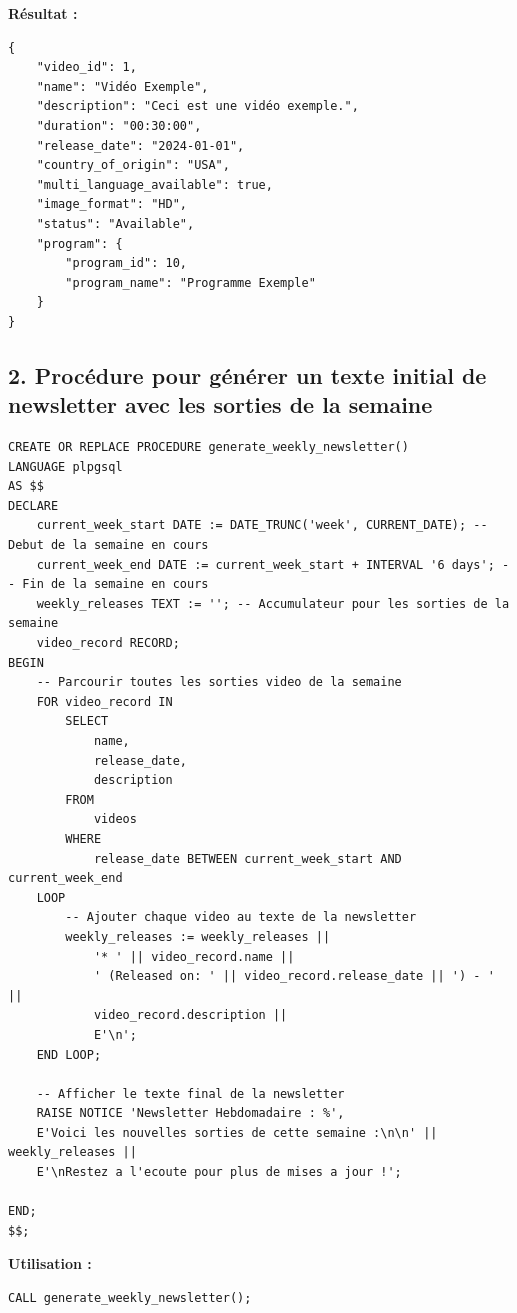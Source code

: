 \documentclass[a4paper, 12pt]{article}
\begin{document}
\textbf{Résultat :}

\begin{verbatim}
{
    "video_id": 1,
    "name": "Vidéo Exemple",
    "description": "Ceci est une vidéo exemple.",
    "duration": "00:30:00",
    "release_date": "2024-01-01",
    "country_of_origin": "USA",
    "multi_language_available": true,
    "image_format": "HD",
    "status": "Available",
    "program": {
        "program_id": 10,
        "program_name": "Programme Exemple"
    }
}
\end{verbatim}

\subsection*{2. Procédure pour générer un texte initial de newsletter avec les sorties de la semaine}

\begin{lstlisting}
CREATE OR REPLACE PROCEDURE generate_weekly_newsletter()
LANGUAGE plpgsql
AS $$
DECLARE
    current_week_start DATE := DATE_TRUNC('week', CURRENT_DATE); -- Debut de la semaine en cours
    current_week_end DATE := current_week_start + INTERVAL '6 days'; -- Fin de la semaine en cours
    weekly_releases TEXT := ''; -- Accumulateur pour les sorties de la semaine
    video_record RECORD;
BEGIN
    -- Parcourir toutes les sorties video de la semaine
    FOR video_record IN 
        SELECT 
            name, 
            release_date, 
            description 
        FROM 
            videos 
        WHERE 
            release_date BETWEEN current_week_start AND current_week_end
    LOOP
        -- Ajouter chaque video au texte de la newsletter
        weekly_releases := weekly_releases || 
            '* ' || video_record.name || 
            ' (Released on: ' || video_record.release_date || ') - ' || 
            video_record.description || 
            E'\n';
    END LOOP;

    -- Afficher le texte final de la newsletter
    RAISE NOTICE 'Newsletter Hebdomadaire : %', 
    E'Voici les nouvelles sorties de cette semaine :\n\n' || weekly_releases || 
    E'\nRestez a l'ecoute pour plus de mises a jour !';

END;
$$;
\end{lstlisting}

\textbf{Utilisation :}

\begin{lstlisting}
CALL generate_weekly_newsletter();
\end{lstlisting}
\end{document}
